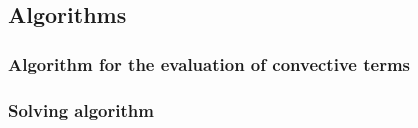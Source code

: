 
\subsection{Algorithms}

\subsubsection{Algorithm for the evaluation of convective terms}

\subsubsection{Solving algorithm}



